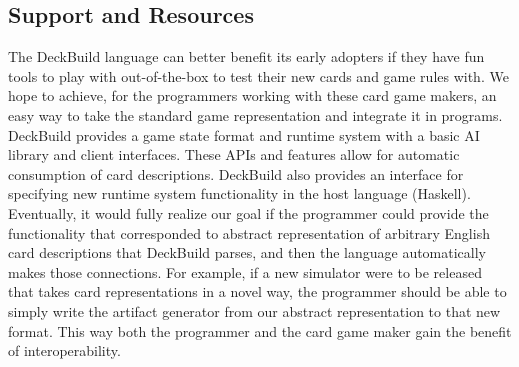 \subsection{Support and Resources}
The DeckBuild language can better benefit its early adopters if they have fun tools to play with out-of-the-box to test their
new cards and game rules with. We hope to achieve, for the programmers working
with these card game makers, an easy way to take the standard game representation and integrate it in
programs. DeckBuild provides a game state format and runtime system with a basic AI library and client interfaces.
These APIs and features allow for automatic consumption of card descriptions. DeckBuild also provides an interface
for specifying new runtime system functionality in the host language (Haskell). Eventually, it would fully
realize our goal if the programmer could provide the functionality that corresponded to abstract representation of arbitrary
English card descriptions that DeckBuild parses, and then the language automatically makes those connections. For example, if a new
simulator were to be released that takes card representations in a novel way, the programmer should be able to simply write the artifact
generator from our abstract representation to that new format. This way both the programmer and the card game maker gain the benefit
of interoperability.

